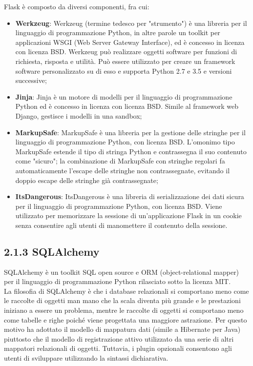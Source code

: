 Flask è composto da diversi componenti, fra cui: 
\begin{itemize}
    \item \textbf{Werkzeug}: Werkzeug (termine tedesco per "strumento") è una libreria per il linguaggio di programmazione Python, in altre parole un toolkit per applicazioni WSGI (Web Server Gateway Interface), ed è concesso in licenza con licenza BSD. Werkzeug può realizzare oggetti software per funzioni di richiesta, risposta e utilità. Può essere utilizzato per creare un framework software personalizzato su di esso e supporta Python 2.7 e 3.5 e versioni successive;
    \item \textbf{Jinja}: Jinja è un motore di modelli per il linguaggio di programmazione Python ed è concesso in licenza con licenza BSD. Simile al framework web Django, gestisce i modelli in una sandbox;
    \item \textbf{MarkupSafe}: MarkupSafe è una libreria per la gestione delle stringhe per il linguaggio di programmazione Python, con licenza BSD. L'omonimo tipo MarkupSafe estende il tipo di stringa Python e contrassegna il suo contenuto come "sicuro"; la combinazione di MarkupSafe con stringhe regolari fa automaticamente l'escape delle stringhe non contrassegnate, evitando il doppio escape delle stringhe già contrassegnate;
    \item \textbf{ItsDangerous}: ItsDangerous è una libreria di serializzazione dei dati sicura per il linguaggio di programmazione Python, con licenza BSD. Viene utilizzato per memorizzare la sessione di un'applicazione Flask in un cookie senza consentire agli utenti di manomettere il contenuto della sessione.
\end{itemize}


\subsection*{2.1.3 \hspace{1cm} SQLAlchemy}
SQLAlchemy è un toolkit SQL open source e ORM (object-relational mapper) per il linguaggio di programmazione Python rilasciato sotto la licenza MIT. \\

La filosofia di SQLAlchemy è che i database relazionali si comportano meno come le raccolte di oggetti man mano che la scala diventa più grande e le prestazioni iniziano a essere un problema, mentre le raccolte di oggetti si comportano meno come tabelle e righe poiché viene progettata una maggiore astrazione. Per questo motivo ha adottato il modello di mappatura dati (simile a Hibernate per Java) piuttosto che il modello di registrazione attivo utilizzato da una serie di altri mappatori relazionali di oggetti. Tuttavia, i plugin opzionali consentono agli utenti di sviluppare utilizzando la sintassi dichiarativa. \\

